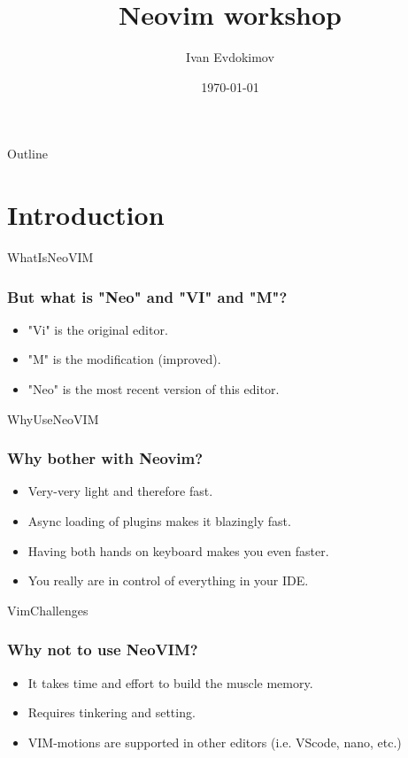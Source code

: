\documentclass{beamer}
\title{Neovim workshop}
\author{Ivan Evdokimov}
\date{\today}
\begin{document}
\begin{frame}
    \titlepage
\end{frame}

\begin{frame}{Outline}
    \begingroup
    \tableofcontents
    \endgroup
\end{frame}

\section{Introduction}
\begin{frame}{WhatIsNeoVIM}
    \frametitle{But what is "Neo" and "VI" and "M"?}
    \begin{itemize}
        \item "Vi" is the original editor.
        \item "M" is the modification (improved).
        \item "Neo" is the most recent version of this editor.
    \end{itemize}
\end{frame}

\begin{frame}{WhyUseNeoVIM}
    \frametitle{Why bother with Neovim?}
    \begin{itemize}
        \item Very-very light and therefore fast.
        \item Async loading of plugins makes it blazingly fast.
        \item Having both hands on keyboard makes you even faster.
        \item You really are in control of everything in your IDE.
    \end{itemize}
\end{frame}

\begin{frame}{VimChallenges}
    \frametitle{Why \textbf{not} to use NeoVIM?}
    \begin{itemize}
        \item It takes time and effort to build the muscle memory.
        \item Requires tinkering and setting.
        \item VIM-motions are supported in other editors (i.e. VScode, nano, etc.)
    \end{itemize}
\end{frame}
\end{document}
